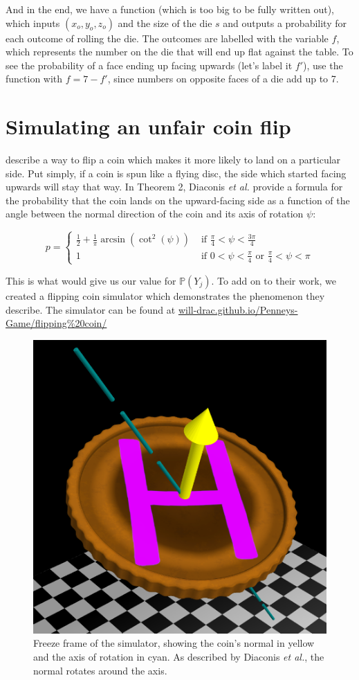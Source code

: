 \documentclass[english,12pt,a4paper,final]{article}
\begin{document}
And in the end, we have a function (which is too big to be fully written out), which inputs $(x_o, y_o, z_o)$ and the size of the die $s$ and outputs a probability for each outcome of rolling the die. The outcomes are labelled with the variable $f$, which represents the number on the die that will end up flat against the table. To see the probability of a face ending up facing upwards (let's label it $f'$), use the function with $f=7-f'$, since numbers on opposite faces of a die add up to 7.

\section{Simulating an unfair coin flip}

\textcite{unfairCoin} describe a way to flip a coin which makes it more likely to land on a particular side. Put simply, if a coin is spun like a flying disc, the side which started facing upwards will stay that way. In Theorem 2, Diaconis \textit{et al.} provide a formula for the probability that the coin lands on the upward-facing side as a function of the angle between the normal direction of the coin and its axis of rotation $\psi$:

\begin{equation}\label{coinProbByAngle}
	p = \begin{cases}
		\frac{1}{2} + \frac{1}{\pi}\arcsin(\cot^2(\psi)) & \text{ if } \frac{\pi}{4}<\psi<\frac{3\pi}{4}
		\\
		1 & \text{ if } 0<\psi<\frac{\pi}{4} \text{ or } \frac{\pi}{4} < \psi < \pi
	\end{cases}
\end{equation}

This is what would give us our value for $\mathbb{P}(Y_j)$. To add on to their work, we created a flipping coin simulator which demonstrates the phenomenon they describe. The simulator can be found at \href{https://will-drac.github.io/Penneys-Game/flipping%20coin/}{will-drac.github.io/Penneys-Game/flipping\%20coin/}

\begin{figure}[H]
	\centering
	\includegraphics[width=0.5\linewidth]{flippingCoin}
	\caption{Freeze frame of the simulator, showing the coin's normal in yellow and the axis of rotation in cyan. As described by Diaconis \textit{et al.}, the normal rotates around the axis.}
	\label{fig:flippingcoin}
\end{figure}
\end{document}
